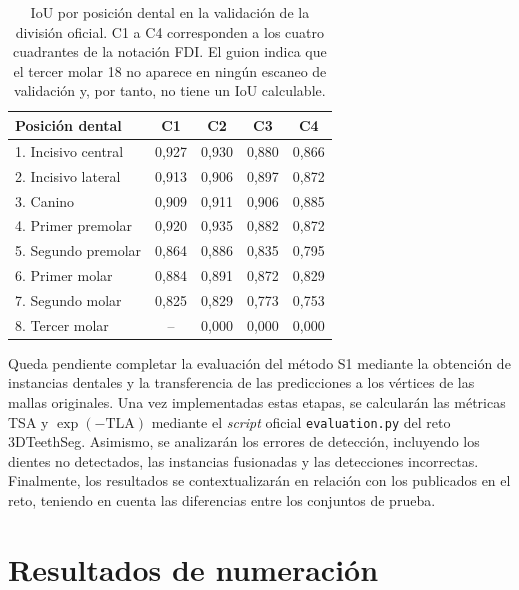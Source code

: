 \begin{table}[htbp]
    \centering
    \small
    \begin{tabular}{lcccc}
         \hline
         \textbf{Posición dental} & \textbf{C1} & \textbf{C2} & \textbf{C3} & \textbf{C4} \\
         \hline
         1. Incisivo central & 0{,}927 & 0{,}930 & 0{,}880 & 0{,}866 \\
         2. Incisivo lateral & 0{,}913 & 0{,}906 & 0{,}897 & 0{,}872 \\
         3. Canino & 0{,}909 & 0{,}911 & 0{,}906 & 0{,}885 \\
         4. Primer premolar & 0{,}920 & 0{,}935 & 0{,}882 & 0{,}872 \\
         5. Segundo premolar & 0{,}864 & 0{,}886 & 0{,}835 & 0{,}795 \\
         6. Primer molar & 0{,}884 & 0{,}891 & 0{,}872 & 0{,}829 \\
         7. Segundo molar & 0{,}825 & 0{,}829 & 0{,}773 & 0{,}753 \\
         8. Tercer molar & -- & 0{,}000 & 0{,}000 & 0{,}000 \\
         \hline
    \end{tabular}
    \caption{IoU por posición dental en la validación de la división oficial. C1 a C4 corresponden a los cuatro cuadrantes de la notación FDI. El guion indica que el tercer molar 18 no aparece en ningún escaneo de validación y, por tanto, no tiene un IoU calculable.}
    \label{tab:iou-dientes-oficial}
\end{table}

Queda pendiente completar la evaluación del método S1 mediante la obtención de instancias dentales y la transferencia de las predicciones a los vértices de las mallas originales. Una vez implementadas estas etapas, se calcularán las métricas TSA y $\exp(-\mathrm{TLA})$ mediante el \textit{script} oficial \texttt{evaluation.py} del reto 3DTeethSeg. Asimismo, se analizarán los errores de detección, incluyendo los dientes no detectados, las instancias fusionadas y las detecciones incorrectas. Finalmente, los resultados se contextualizarán en relación con los publicados en el reto, teniendo en cuenta las diferencias entre los conjuntos de prueba.

\section{Resultados de numeración}
\label{sec:exp-numeracion}

